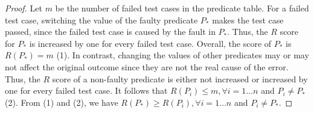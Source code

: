 \begin{proof}
Let $m$ be the number of failed test cases in the predicate table. For
a failed test case, switching the value of the faulty predicate $P_*$
makes the test case passed, since the failed test case is caused by
the fault in $P_*$. Thus, the $R$ score for $P_*$ is increased by
one for every failed test case. Overall, the score of
$P_*$ is $R(P_*) = m$ (1). In contrast, changing the values of other
predicates may or may not affect the original outcome since they are
not the real cause of the error. Thus, the $R$ score of a non-faulty
predicate is either not increased or increased by one for every failed
test case. It follows that $R(P_i) \le m, \forall i = 1 \ldots n$ and
$P_i \neq P_*$ (2). From (1) and (2), we have $R(P_*) \ge
R(P_i), \forall i = 1 \ldots n$ and $P_i \neq P_*$.
\end{proof}

 
